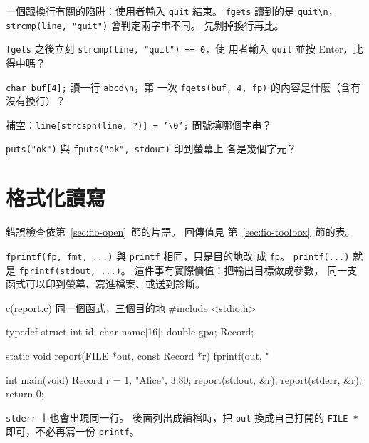 一個跟換行有關的陷阱：使用者輸入 \texttt{quit} 結束。
\texttt{fgets} 讀到的是 \texttt{quit\textbackslash n}，
\texttt{strcmp(line, "quit")} 會判定兩字串不同。 先剝掉換行再比。


\begin{drills}[label=drills:fio-line]
\item \texttt{fgets} 之後立刻 \texttt{strcmp(line, "quit") == 0}，使
用者輸入 \texttt{quit} 並按 Enter，比得中嗎？
\item \texttt{char buf[4];} 讀一行 \texttt{abcd\textbackslash n}，第
一次 \texttt{fgets(buf, 4, fp)} 的內容是什麼（含有沒有換行）？
\item 補空：\texttt{line[strcspn(line, ?)] = '\textbackslash 0';}
問號填哪個字串？
\item \texttt{puts("ok")} 與 \texttt{fputs("ok", stdout)} 印到螢幕上
各是幾個字元？
\end{drills}

\section{格式化讀寫}
\label{sec:fio-fmt}

錯誤檢查依第~\ref{sec:fio-open}~節的片語。 回傳值見
第~\ref{sec:fio-toolbox}~節的表。

\texttt{fprintf(fp, fmt, ...)} 與 \texttt{printf} 相同，只是目的地改
成 \texttt{fp}。 \texttt{printf(...)} 就是
\texttt{fprintf(stdout, ...)}。 這件事有實際價值：把輸出目標做成參數，
同一支函式可以印到螢幕、寫進檔案、或送到診斷。

\begin{example}[label=ex:fio-report]{c}{(report.c) 同一個函式，三個目的地}
#include <stdio.h>

typedef struct {
    int id;
    char name[16];
    double gpa;
} Record;

static void report(FILE *out, const Record *r) {
    fprintf(out, "%
}

int main(void) {
    Record r = {1, "Alice", 3.80};
    report(stdout, &r);
    report(stderr, &r);
    return 0;
}
\end{example}


\texttt{stderr} 上也會出現同一行。 後面列出成績檔時，把 \texttt{out}
換成自己打開的 \texttt{FILE *} 即可，不必再寫一份 \texttt{printf}。

